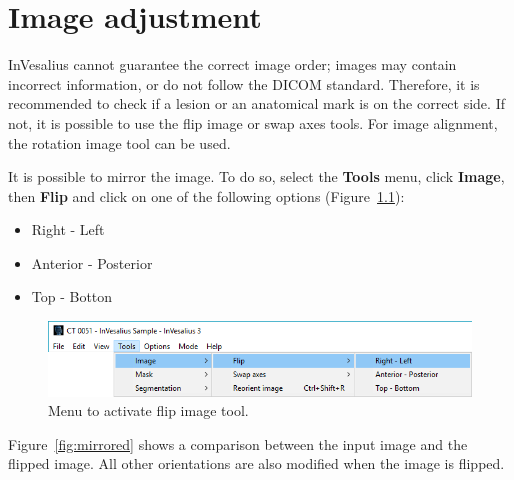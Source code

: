 \chapter{Image adjustment}

InVesalius cannot guarantee the correct image order; images may contain incorrect information, or do not follow the DICOM standard. Therefore, it is recommended to check if a lesion or an anatomical mark is on the correct side. If not, it is possible to use the flip image or swap axes tools. For image alignment, the rotation image tool can be used.

It is possible to mirror the image. To do so, select the \textbf{Tools} menu, click \textbf{Image}, then \textbf{Flip} and click on one of the following options (Figure~\ref{fig:menu_img_mirroring_axis_pt}):

\begin{itemize}
	\item Right - Left
	\item Anterior - Posterior
	\item Top - Botton
\end{itemize}

\begin{figure}[!htb]
\centering
\includegraphics[scale=0.4]{../user_guide_figures/invesalius_screen/menu_img_mirroring_axis_en.png}
\caption{Menu to activate flip image tool.}
\label{fig:menu_img_mirroring_axis_pt}
\end{figure}


Figure~\ref{fig:mirrored} shows a comparison between the input image and the flipped image. All other orientations are also modified when the image is flipped.

